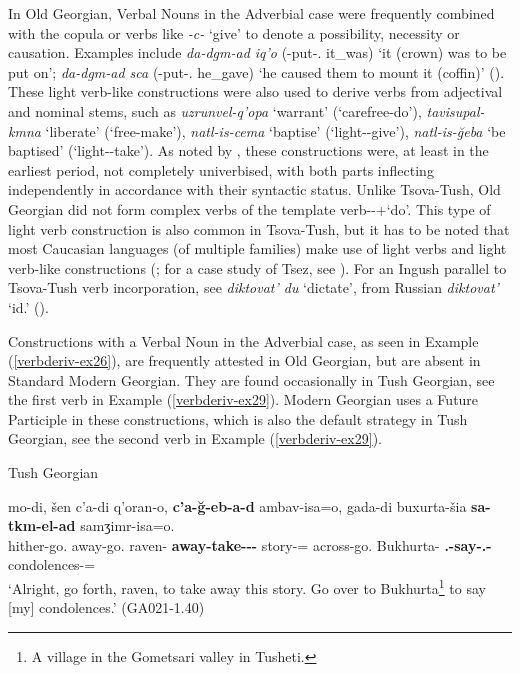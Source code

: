 In Old Georgian, Verbal Nouns in the Adverbial case were frequently combined with the copula or verbs like \textit{-c-} ‘give’ to denote a possibility, necessity or causation. Examples include \textit{da-dgm-ad iq’o} ({\Pv}-put-{\Vn}.{\Advb} it\_was)  `it (crown) was to be put on'; \textit{da-dgm-ad sca} ({\Pv}-put-{\Vn}.{\Advb} he\_gave) `he caused them to mount it (coffin)' (\cites{gippertOGeo}). These light verb-like constructions were also used to derive verbs from adjectival and nominal stems, such as \textit{uzrunvel-q’opa} `warrant’ (`carefree-do’), \textit{tavisupal-kmna} `liberate’ (`free-make’), \textit{natl-is-cema} `baptise’ (`light-{\Gen}-give’), \textit{natl-is-\u{g}eba} `be baptised’ (`light-{\Gen}-take’). As noted by \textcite{gippertOGeo}, these constructions were, at least in the earliest period, not completely univerbised, with both parts inflecting independently in accordance with their syntactic status. Unlike Tsova-Tush, Old Georgian did not form complex verbs of the template verb-{\Vn}-{\Advb}+`do'. This type of light verb construction is also common in Tsova-Tush, but it has to be noted that most Caucasian languages (of multiple families) make use of light verbs and light verb-like constructions (\cites{nichols03bipartite}; for a case study of Tsez, see \cites[]{comrie2000tsezval}). For an Ingush parallel to Tsova-Tush verb incorporation, see \textit{diktovat' du} `dictate', from Russian \textit{diktovat'} `id.' (\cites[337]{nichols11}).

Constructions with a Verbal Noun in the Adverbial case, as seen in Example (\ref{verbderiv-ex26}), are frequently attested in Old Georgian, but are absent in Standard Modern Georgian. They are found occasionally in Tush Georgian, see the first verb in Example (\ref{verbderiv-ex29}). Modern Georgian uses a Future Participle in these constructions, which is also the default strategy in Tush Georgian, see the second verb in Example (\ref{verbderiv-ex29}).

	\begin{exe}
		\ex\label{verbderiv-ex29}
		Tush Georgian
        
		\gll  mo-di, šen c'a-di q'oran-o, \textbf{c'a-ğ-eb-a-d} ambav-isa=o, gada-di buxurta-šia \textbf{sa-tkm-el-ad} samʒimr-isa=o. \\
		hither-go.{\Imp} {\Ssg} away-go.{\Imp} raven-{\Voc} \textbf{away-take-{\Tm}-{\Vn}-{\Advb}} story-{\Gen}={\Quot} across-go.{\Imp} Bukhurta-{\In} \textbf{{\Ptcp}.{\Fut}-say-{\Ptcp}.{\Fut}-{\Advb}} condolences-{\Gen}={\Quot}\\
		\trans `Alright, go forth, raven, to take away this story. Go over to Bukhurta\footnote{A village in the Gometsari valley in Tusheti.} to say [my] condolences.'
		\hfill (GA021-1.40)
	\end{exe}


